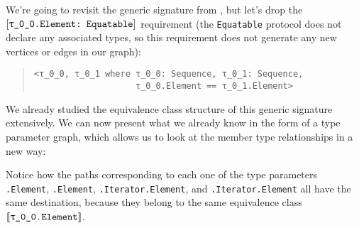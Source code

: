 \documentclass[../generics]{subfiles}
\begin{document}
\begin{example}\label{two sequence same element example} We're going to revisit the generic signature from , but let's drop the $\ConfReq{\rT.Element}{Equatable}$ requirement (the \texttt{Equatable} protocol does not declare any associated types, so this requirement does not generate any new vertices or edges in our graph):
\begin{quote}
\begin{verbatim}
<τ_0_0, τ_0_1 where τ_0_0: Sequence, τ_0_1: Sequence,
                    τ_0_0.Element == τ_0_1.Element>
\end{verbatim}
\end{quote}
We already studied the equivalence class structure of this generic signature extensively. We can now present what we already know in the form of a type parameter graph, which allows us to look at the member type relationships in a new way:
\begin{center}
\end{center}
Notice how the paths corresponding to each one of the type parameters \texttt{\rT.Element}, \texttt{\rU.Element}, \texttt{\rT.Iterator.Element}, and \texttt{\rU.Iterator.Element} all have the same destination, because they belong to the same equivalence class $\archetype{\rT.Element}$.
\end{example}
\end{document}
